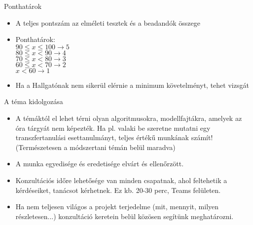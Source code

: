 \documentclass[english, aspectratio=169]{beamer}
\begin{document}
\begin{frame}{Ponthatárok}
\begin{itemize}
	\item A teljes pontszám az elméleti tesztek és a beadandók összege
	\item Ponthatárok:\\
	$90 \leq x \leq 100 \rightarrow 5$\\
	$80 \leq x < 90 \rightarrow 4$\\
	$70 \leq x < 80 \rightarrow 3$\\
	$60 \leq x < 70 \rightarrow 2$\\
	$x < 60 \rightarrow 1$
	\item Ha a Hallgatónak nem sikerül elérnie a minimum követelményt, tehet vizsgát
\end{itemize}
\end{frame}

\begin{frame}{A téma kidolgozása}
\begin{itemize}
	\item A témáktól el lehet térni olyan algoritmusokra, modellfajtákra, amelyek az óra tárgyát nem képezték. Ha pl. valaki be szeretne mutatni egy transzfertanulási esettanulmányt, teljes értékű munkának számít! (Természetesen a módszertani témán belül maradva)
	\item A munka egyedisége és eredetisége elvárt és ellenőrzött.
	\item Konzultációs időre lehetősége van minden csapatnak, ahol feltehetik a kérdéseiket, tanácsot kérhetnek. Ez kb. 20-30 perc, Teams felületen.
	\item Ha nem teljesen világos a projekt terjedelme (mit, mennyit, milyen részletesen...) konzultáció keretein belül közösen segítünk meghatározni.
\end{itemize}
\end{frame}
\end{document}
